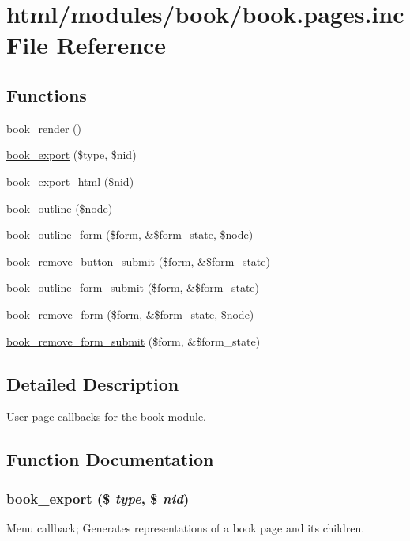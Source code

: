 \hypertarget{book_8pages_8inc}{
\section{html/modules/book/book.pages.inc File Reference}
\label{book_8pages_8inc}
}
\subsection*{Functions}
\begin{DoxyCompactItemize}
\item 
\hyperlink{book_8pages_8inc_ab9a467483a4cc1909dc16838d6760eea}{book\_\-render} ()
\item 
\hyperlink{book_8pages_8inc_adcfa1ae54cd2673dfedbae459ea573de}{book\_\-export} (\$type, \$nid)
\item 
\hyperlink{book_8pages_8inc_a9916aa7ebfa4de8b221ba9e33592bb69}{book\_\-export\_\-html} (\$nid)
\item 
\hyperlink{book_8pages_8inc_a13983b7dd1920acb58635a7784c719b1}{book\_\-outline} (\$node)
\item 
\hyperlink{group__forms_ga4903d29a89909f072c1aab2f8d718bdb}{book\_\-outline\_\-form} (\$form, \&\$form\_\-state, \$node)
\item 
\hyperlink{book_8pages_8inc_abcf4790efab7bbb44fda88de9ed0847e}{book\_\-remove\_\-button\_\-submit} (\$form, \&\$form\_\-state)
\item 
\hyperlink{book_8pages_8inc_ad5f27af5889dbe2ad72df81fd4cd2665}{book\_\-outline\_\-form\_\-submit} (\$form, \&\$form\_\-state)
\item 
\hyperlink{group__forms_gab7e8aa290196982f23b50a984e215805}{book\_\-remove\_\-form} (\$form, \&\$form\_\-state, \$node)
\item 
\hyperlink{book_8pages_8inc_aca2b07a50dae6ef3a271b984dae19c7e}{book\_\-remove\_\-form\_\-submit} (\$form, \&\$form\_\-state)
\end{DoxyCompactItemize}


\subsection{Detailed Description}
User page callbacks for the book module. 

\subsection{Function Documentation}
\hypertarget{book_8pages_8inc_adcfa1ae54cd2673dfedbae459ea573de}{
\subsubsection[{book\_\-export}]{\setlength{\rightskip}{0pt plus 5cm}book\_\-export (\$ {\em type}, \/  \$ {\em nid})}}
\label{book_8pages_8inc_adcfa1ae54cd2673dfedbae459ea573de}
Menu callback; Generates representations of a book page and its children.

